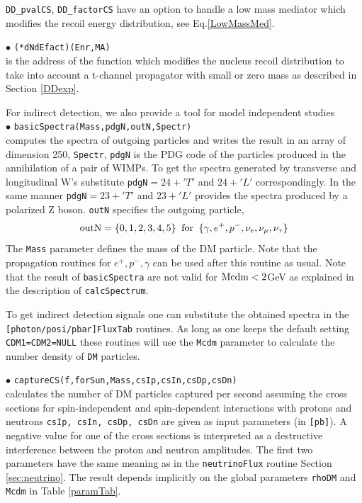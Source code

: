 \documentclass[12pt,a4paper]{article}
\begin{document}
\verb|DD_pvalCS|, \verb|DD_factorCS|   have an option to handle  a low mass mediator which  modifies the recoil energy
distribution, see Eq.\ref{LowMassMed}.



\noindent
$\bullet$ \verb|(*dNdEfact)(Enr,MA)|\\
is the address of the function which modifies the nucleus recoil distribution to take into account a 
t-channel propagator  with  small or zero mass as described in Section \ref{DDexp}.





For indirect detection, we also provide a tool for model independent studies\\ 
\noindent
$\bullet$ \verb|basicSpectra(Mass,pdgN,outN,Spectr)|\\
computes the spectra of outgoing particles and writes the result in an array of dimension 250, \verb|Spectr|,
\verb|pdgN| is the PDG code of the particles produced in the annihilation of a pair of 
WIMPs. To get the spectra generated by transverse and longitudinal W's substitute 
\verb|pdgN|$=24+'T'$ and $24+'L'$ correspondingly. In the same manner \verb|pdgN|$=23+'T'$ and
$23+'L'$  provides the spectra produced by a polarized Z boson.
 \verb|outN|  specifies the outgoing particle,
$$ {\rm outN} = \{0,1,2,3,4,5\} \;\; {\rm for}\;\; \{\gamma,   e^+,  p^-, \nu_e,
\nu_{\mu},\nu_{\tau}\} $$
The {\tt Mass} parameter defines the mass of the DM particle.
Note that the  propagation routines for $e^+,p^-,\gamma$ can be used after 
this routine as usual. Note that the result of {\tt basicSpectra}
are not valid for ${\rm Mcdm} < 2$GeV as explained in the description of {\tt calcSpectrum}.  

To get indirect detection signals one can substitute the obtained spectra in the\\ 
{\tt [photon/posi/pbar]FluxTab} routines. As long as one keeps the default setting  {\tt CDM1=CDM2=NULL} these routines will use the {\tt Mcdm} parameter to calculate the number density of {\tt DM} particles. 
  

\noindent $\bullet$ \verb|captureCS(f,forSun,Mass,csIp,csIn,csDp,csDn)|\\
calculates the number of DM particles captured per second assuming the cross sections
for  spin-independent and spin-dependent 
interactions with protons and neutrons   {\tt csIp, csIn, csDp, csDn} are
given as input parameters (in {\tt [pb]}). 
A negative value for one of the cross sections  is interpreted as a destructive
interference between the  proton and neutron amplitudes. The first two
parameters have the same meaning as in the {\tt neutrinoFlux} routine Section \ref{sec:neutrino}. The
result  depends implicitly on the global parameters {\tt rhoDM} and {\tt
Mcdm} in Table \ref{paramTab}. 
\end{document}
